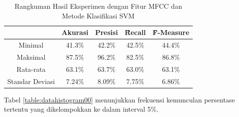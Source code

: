  \begin{table}
    \centering
    \caption{Rangkuman Hasil Eksperimen dengan Fitur MFCC dan Metode Klasifikasi SVM}
    \begin{tabular}{|c|c|c|c|c|}
      \hline
       & Akurasi & Presisi & \f{\f{Recall}} & \f{\f{F-Measure}} \\ \hline
      Minimal         & 41.3\% & 42.2\% & 42.5\% & 44.4\% \\ \hline
      Maksimal        & 87.5\% & 96.2\% & 82.5\% & 86.8\% \\ \hline
      Rata-rata       & 63.1\% & 63.7\% & 63.0\% & 63.1\% \\ \hline
      Standar Deviasi & 7.24\% & 8.09\% & 7.75\% & 6.86\%  \\ \hline
    \end{tabular}
    \label{table:mfccsvm}
  \end{table}

  Tabel \ref{table:datahistogram00} menunjukkan frekuensi kemunculan persentase tertentu yang dikelompokkan ke dalam interval 5\%.

